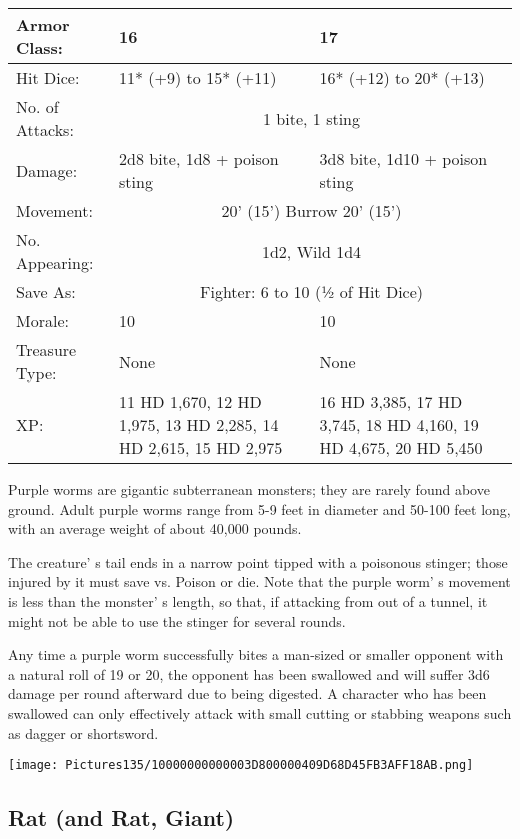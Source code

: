 \documentclass[a4paper,twoside,openany,10pt]{book}
\begin{document}
\begin{multicols}{2}
\begin{tabularx}{0.50\textwidth}{@{}lXX@{}}
Armor Class: & 16 & 17 \\\hline
Hit Dice: & 11* (+9) to 15* (+11) & 16* (+12) to 20* (+13) \\\hline
No. of Attacks: & \multicolumn{2}{c}{1 bite, 1 sting} \\\hline
Damage: & 2d8 bite, 1d8 + poison sting & 3d8 bite, 1d10 + poison sting \\\hline
Movement: & \multicolumn{2}{c}{20' (15') Burrow 20' (15')}\\\hline
No. Appearing: &  \multicolumn{2}{c}{1d2, Wild 1d4}\\\hline
Save As: & \multicolumn{2}{c}{Fighter: 6 to 10 (½ of Hit Dice)} \\\hline
Morale: & 10 & 10 \\\hline
Treasure Type: & None & None \\\hline
XP: & 11 HD 1,670, 12 HD 1,975, 13 HD 2,285, 14 HD 2,615, 15 HD 2,975 & 16 HD 3,385, 17 HD 3,745, 18 HD 4,160, 19 HD 4,675, 20 HD 5,450  \\\hline
\end{tabularx}\medskip

Purple worms are gigantic subterranean monsters; they are rarely found above ground. Adult purple worms range from 5-9 feet in diameter and 50-100 feet long, with an average weight of about 40,000 pounds. 

The creature' s tail ends in a narrow point tipped with a poisonous stinger; those injured by it must save vs. Poison or die. Note that the purple worm' s movement is less than the monster' s length, so that, if attacking from out of a tunnel, it might not be able to use the stinger for several rounds.

Any time a purple worm successfully bites a man-sized or smaller opponent with a natural roll of 19 or 20, the opponent has been swallowed and will suffer 3d6 damage per round afterward due to being digested. A character who has been swallowed can only effectively attack with small cutting or stabbing weapons such as dagger or shortsword.

\begin{center} \texttt{[image: Pictures135/10000000000003D800000409D68D45FB3AFF18AB.png]} \end{center}


\subsection*{Rat (and Rat, Giant)}\label{rat-and-rat-giant}


\end{multicols}
\end{document}
